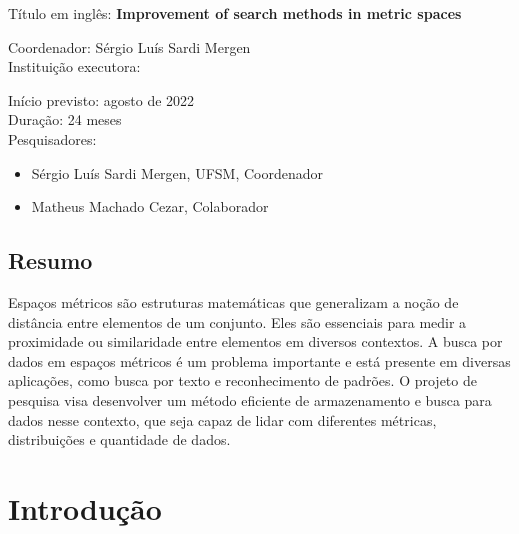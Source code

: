 \documentclass[a4paper,12pt,oneside]{article}
\newcommand{\engtitle}{Improvement of search methods in metric spaces}
\newcommand{\edital}{nome do edital}
\begin{document}
\begin{otherlanguage}{english}
\noindent
Título em inglês: {\bf \engtitle}\\
\end{otherlanguage}

\noindent
Coordenador: Sérgio Luís Sardi Mergen\\

\noindent
Instituição executora: \ufsm \\


\noindent

\noindent
Início previsto: agosto de 2022 \\

\noindent
Duração: 24 meses \\

\noindent
Pesquisadores:
\begin{itemize}
\item Sérgio Luís Sardi Mergen, UFSM, Coordenador
\item Matheus Machado Cezar, Colaborador
\end{itemize}

\subsection{Resumo}

Espaços métricos são estruturas matemáticas que generalizam a noção de distância entre elementos de um conjunto. Eles são essenciais para medir a proximidade ou similaridade entre elementos em diversos contextos. A busca por dados em espaços métricos é um problema importante e está presente em diversas aplicações, como busca por texto e reconhecimento de padrões. O projeto de pesquisa visa desenvolver um método eficiente de armazenamento e busca para dados nesse contexto, que seja capaz de lidar com diferentes métricas, distribuições e quantidade de dados.

\section{Introdução}
\end{document}
